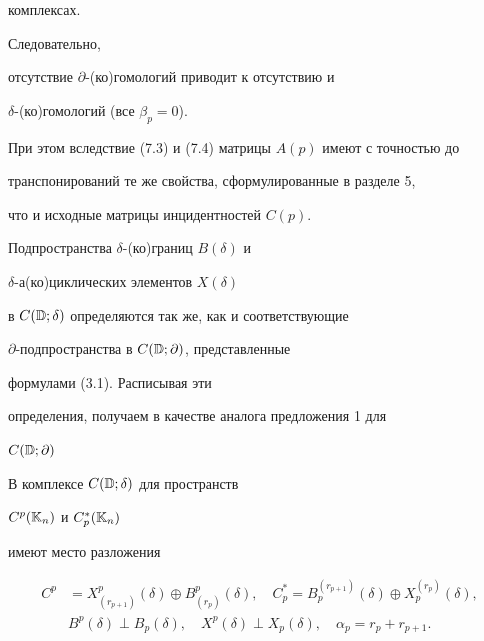 комплексах. 


Следовательно,  


отсутствие $\partial$-(ко)гомологий приводит к отсутствию и 


$\delta$-(ко)гомологий (все $\beta_p=0$). 


При этом вследствие (7.3) и (7.4) матрицы $A(p)$ имеют с точностью до 


транспонирований те же свойства, сформулированные в разделе 5, 


что и исходные матрицы инцидентностей $C(p)$. 


 


Подпространства $\delta$-(ко)границ $B(\delta)$ и 


$\delta$-а(ко)циклических элементов $X(\delta)$ 


в $C(\Bbb D;\delta)$ определяются так же, как и соответствующие  


$\partial$-подпространства в $C(\Bbb D;\partial)$, представленные 


формулами (3.1). Расписывая эти 


определения, получаем в качестве аналога предложения 1 для 


$C(\Bbb D;\partial)$ 


\setcounter{prop}{5} 


 


\begin{prop} В комплексе $C(\Bbb D;\delta)$ для пространств 


$C^p(\Bbb K_n)$ и $C^*_p(\Bbb K_n)$ 


имеют место разложения 


\begin{equation} 


\begin{split} 


C^p&=X^p_{(r_{p+1})}(\delta)\oplus B^p_{(r_p)}(\delta),\quad 


C^*_p=B^{(r_{p+1})}_p(\delta)\oplus 


X^{(r_p)}_p(\delta),\\ 


&B^p(\delta)\perp B_p(\delta),\quad X^p(\delta)\perp 


X_p(\delta),\quad \alpha_p=r_p+r_{p+1}. 


\end{split} 


\end{equation} 


\end{prop} 


